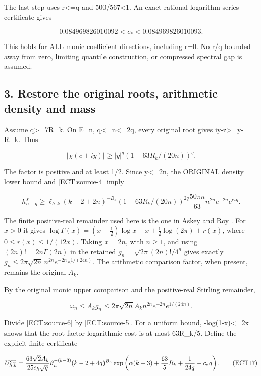 \documentclass[11pt,a4paper]{article}
\begin{document}
The last step uses r\textless=q and 500/567\textless1. An exact rational logarithm-series certificate gives

\[
0.084969826010092<c_*<0.084969826010093.
\tag{ECT13}\label{ECT:eq-13}\]

This holds for ALL monic coefficient directions, including r=0. No r/q bounded away from zero, limiting quantile construction, or compressed spectral gap is assumed.

\subsection{3. Restore the original roots, arithmetic density and mass}\label{ECT:restore-the-original-roots-arithmetic-density-and-mass}

Assume q\textgreater=7R\_k. On E\_n, q\textless=n\textless=2q, every original root gives \textbar iy-z\textbar\textgreater=\textbar y\textbar-R\_k. Thus

\[
|\chi(c+iy)|\ge |y|^q(1-63R_k/(20n))^q.
\tag{ECT14}\label{ECT:eq-14}\]

The factor is positive and at least 1/2. Since \textbar y\textbar\textless=2n, the ORIGINAL density lower bound and \eqref{ECT:source-4} imply

\[
h_{n-q}^\chi\ge\ell_{h,k}(k-2+2n)^{-B_h}
(1-63R_k/(20n))^{2q}\frac{50\pi n}{63}n^{2n}e^{-2n}e^{c_*q}.
\tag{ECT15}\label{ECT:source-5}\]

The finite positive-real remainder used here is the one in
Askey and Roy \cite[eq.~(5.11.1), \S5.11(ii)]{human:dlmf5}.
For $x>0$ it gives
$\log\Gamma(x)=(x-\tfrac12)\log x-x+\tfrac12\log(2\pi)+r(x)$,
where $0\le r(x)\le1/(12x)$.
Taking $x=2n$, with $n\ge1$, and using
$(2n)!=2n\Gamma(2n)$ in the retained
$g_n=\sqrt{2\pi}(2n)!/4^n$ gives exactly
$g_n\le2\pi\sqrt{2n}\,n^{2n}e^{-2n}e^{1/(24n)}$.
The arithmetic comparison factor, when present, remains the original
$A_k$.

By the original monic upper comparison and the positive-real Stirling remainder,

\[
\omega_n\le A_kg_n\le2\pi\sqrt{2n}A_kn^{2n}e^{-2n}e^{1/(24n)}.
\tag{ECT16}\label{ECT:source-6}\]

Divide \eqref{ECT:source-6} by \eqref{ECT:source-5}. For a uniform bound, -log(1-x)\textless=2x shows that the root-factor logarithmic cost is at most 63R\_k/5. Define the explicit finite certificate

\[
U_{h,k}^{\rm ctr}=\frac{63\sqrt2 A_k}{25c_h\sqrt q}
\vartheta_h^{-(k-3)}(k-2+4q)^{B_h}
\exp\left(\alpha(k-3)+\frac{63}5R_k+\frac1{24q}-c_*q\right).
\tag{ECT17}\label{ECT:eq-17}\]
\end{document}
